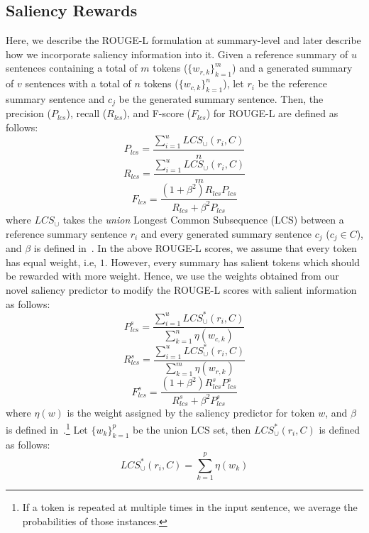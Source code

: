 \documentclass[11pt,a4paper]{article}
\begin{document}
\subsection{Saliency Rewards}
\label{suppl:subsec:saliency-rewards}
Here, we describe the ROUGE-L formulation at summary-level and later describe how we incorporate saliency information into it. Given a reference summary of $u$ sentences containing a total of $m$ tokens ($\{w_{r,k}\}_{k=1}^m$) and a generated summary of $v$ sentences with a total of $n$ tokens ($\{w_{c,k}\}_{k=1}^n$), let $r_i$ be the reference summary sentence and $c_j$ be the generated summary sentence. Then, the precision ($P_{lcs}$), recall ($R_{lcs}$), and F-score ($F_{lcs}$) for ROUGE-L are defined as follows:
\begin{equation}
P_{lcs} = \frac{\sum_{i=1}^u LCS_{\cup} (r_i,C)}{n}
\end{equation}
\begin{equation}
R_{lcs} = \frac{\sum_{i=1}^u LCS_{\cup} (r_i,C)}{m}
\end{equation}
\begin{equation}
F_{lcs} = \frac{(1+\beta^2)R_{lcs}P_{lcs}}{R_{lcs}+\beta^2 P_{lcs}}
\end{equation}
where $LCS_{\cup}$ takes the \emph{union} Longest Common Subsequence (LCS) between a reference summary sentence $r_i$ and every generated summary sentence $c_j$ ($c_j \in C$), and $\beta$ is defined in~. In the above ROUGE-L scores, we assume that every token has equal weight, i.e, $1$. However, every summary has salient tokens which should be rewarded with more weight. Hence, we use the weights obtained from our novel saliency predictor to modify the ROUGE-L scores with salient information as follows:
\begin{equation}
P^s_{lcs} = \frac{\sum_{i=1}^u LCS^*_{\cup} (r_i,C)}{\sum_{k=1}^n \eta(w_{c,k})}
\end{equation}
\begin{equation}
R^s_{lcs} = \frac{\sum_{i=1}^u LCS^*_{\cup} (r_i,C)}{\sum_{k=1}^m \eta(w_{r,k})}
\end{equation}
\begin{equation}
F^s_{lcs} = \frac{(1+\beta^2)R^s_{lcs}P^s_{lcs}}{R^s_{lcs}+\beta^2 P^s_{lcs}}
\end{equation}
where $\eta(w)$ is the weight assigned by the saliency predictor for token $w$, and $\beta$ is defined in~.\footnote{If a token is repeated at multiple times in the input sentence, we average the probabilities of those instances.} Let $\{w_k\}_{k=1}^p$ be the union LCS set, then $LCS^*_{\cup}(r_i,C)$ is defined as follows:
\begin{equation}
LCS^*_{\cup}(r_i,C) = \sum_{k=1}^p \eta(w_k) 
\end{equation}
\end{document}
